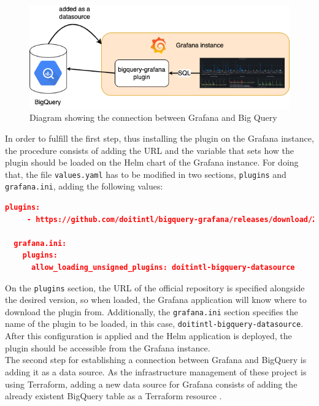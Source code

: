 \documentclass[english, 12pt, a4paper, sci, utf8, a-1b, online]{aaltothesis}
\begin{document}
\begin{figure}[h!]
    \centering
    \includegraphics[scale=0.5]{src/thesis/img/technical-solution/grafana-connection.png}
    \caption{Diagram showing the connection between Grafana and Big Query}
    \label{fig:grafana-connection}
\end{figure}

In order to fulfill the first step, thus installing the plugin on the Grafana instance, the procedure consists of adding the URL and the variable that sets how the plugin should be loaded on the Helm chart of the Grafana instance. For doing that, the file \texttt{values.yaml} has to be modified in two sections, \texttt{plugins} and \texttt{grafana.ini}, adding the following values:\\

\begin{lstlisting}[language=json,firstnumber=1]
  plugins:
     - https://github.com/doitintl/bigquery-grafana/releases/download/2.0.3/doitintl-bigquery-datasource-2.0.3.zip;doit-bigquery-datasource

  grafana.ini:
    plugins:
      allow_loading_unsigned_plugins: doitintl-bigquery-datasource
\end{lstlisting}

On the \texttt{plugins} section, the URL of the official repository is specified alongside the desired version, so when loaded, the Grafana application will know where to download the plugin from. Additionally, the \texttt{grafana.ini} section specifies the name of the plugin to be loaded, in this case, \texttt{doitintl-bigquery-datasource}. After this configuration is applied and the Helm application is deployed, the plugin should be accessible from the Grafana instance. \\

The second step for establishing a connection between Grafana and BigQuery is adding it as a data source. As the infrastructure management of these project is using Terraform, adding a new data source for Grafana consists of adding the already existent BigQuery table as a Terraform resource \cite{TerraformResource}.\\
\end{document}
